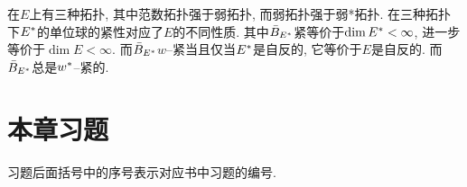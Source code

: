     \begin{Remark}
    在$ E $上有三种拓扑, 其中范数拓扑强于弱拓扑, 而弱拓扑强于弱*拓扑. 在三种拓扑下$ E^{*} $的单位球的紧性对应了$ E $的不同性质. 其中$ \bar{B}_{E^{*}} $紧等价于$ \dim E^{*}<\infty $, 进一步等价于$ \dim E<\infty $. 而$ \bar{B}_{E^{*}} $$ w $--紧当且仅当$ E^{*} $是自反的, 它等价于$ E $是自反的. 而$ \bar{B}_{E^{*}} $总是$ w^{*} $--紧的.
    \end{Remark}
    
\section*{本章习题}
    
    习题后面括号中的序号表示对应书中习题的编号.
    
